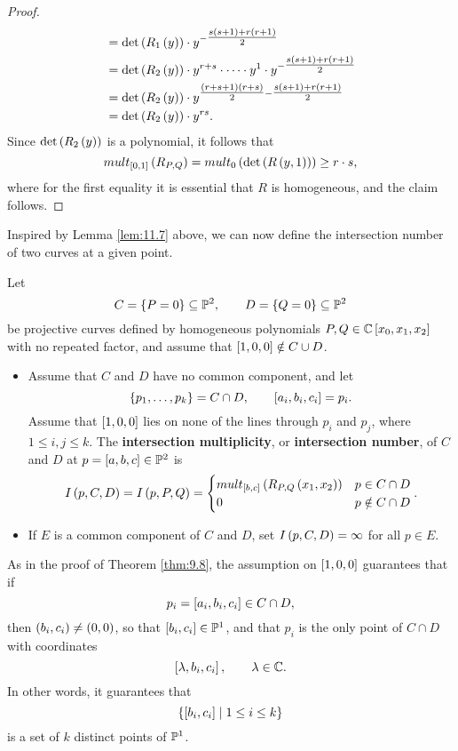 \begin{proof}
\begin{align*}
& = \det\rb{R_1\rb{y}} \cdot y^{-\tfrac{s\rb{s + 1}+r\rb{r + 1}}{2}} \\
& = \det\rb{R_2\rb{y}} \cdot y^{r + s} \cdot \dots \cdot y^1 \cdot y^{-\tfrac{s\rb{s + 1} + r\rb{r + 1}}{2}} \\
& = \det\rb{R_2\rb{y}} \cdot y^{\tfrac{\rb{r + s + 1}\rb{r + s}}{2} - \tfrac{s\rb{s + 1}+r\rb{r + 1}}{2}} \\
& = \det\rb{R_2\rb{y}} \cdot y^{rs}.
\end{align*}
Since $ \det\rb{R_2\rb{y}} $ is a polynomial, it follows that
$$ mult_{\sb{0, 1}}\rb{R_{P, Q}} = mult_0\rb{\det\rb{R\rb{y, 1}}} \ge r \cdot s, $$
where for the first equality it is essential that $ R $ is homogeneous, and the claim follows.
\end{proof}

\pagebreak

Inspired by Lemma \ref{lem:11.7} above, we can now define the intersection number of two curves at a given point.

\begin{definition}
\label{def:11.8}
Let
$$ C = \cb{P = 0} \subseteq \P^2, \qquad D = \cb{Q = 0} \subseteq \P^2 $$
be projective curves defined by homogeneous polynomials $ P, Q \in \C\sb{x_0, x_1, x_2} $ with no repeated factor, and assume that $ \sb{1, 0, 0} \notin C \cup D $.
\begin{itemize}
\item Assume that $ C $ and $ D $ have no common component, and let
$$ \cb{p_1, \dots, p_k} = C \cap D, \qquad \sb{a_i, b_i, c_i} = p_i. $$
Assume that $ \sb{1, 0, 0} $ lies on none of the lines through $ p_i $ and $ p_j $, where $ 1 \le i, j \le k $. The \textbf{intersection multiplicity}, or \textbf{intersection number}, of $ C $ and $ D $ at $ p = \sb{a, b, c} \in \P^2 $ is
$$ I\rb{p, C, D} = I\rb{p, P, Q} =
\begin{cases}
mult_{\sb{b, c}}\rb{R_{P, Q}\rb{x_1, x_2}} & p \in C \cap D \\
0 & p \notin C \cap D
\end{cases}.
$$
\item If $ E $ is a common component of $ C $ and $ D $, set $ I\rb{p, C, D} = \infty $ for all $ p \in E $.
\end{itemize}
\end{definition}

\begin{remark}
As in the proof of Theorem \ref{thm:9.8}, the assumption on $ \sb{1, 0, 0} $ guarantees that if
$$ p_i = \sb{a_i, b_i, c_i} \in C \cap D, $$
then $ \rb{b_i, c_i} \ne \rb{0, 0} $, so that $ \sb{b_i, c_i} \in \P^1 $, and that $ p_i $ is the only point of $ C \cap D $ with coordinates
$$ \sb{\lambda, b_i, c_i}, \qquad \lambda \in \C. $$
In other words, it guarantees that
$$ \cb{\sb{b_i, c_i} \mid 1 \le i \le k} $$
is a set of $ k $ distinct points of $ \P^1 $.
\end{remark}


